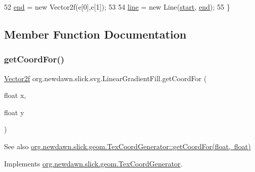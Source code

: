\begin{DoxyCode}
52         \mbox{\hyperlink{classorg_1_1newdawn_1_1slick_1_1svg_1_1_linear_gradient_fill_a708d041bfb9a710bdb328561eacd169e}{end}} = \textcolor{keyword}{new} Vector2f(e[0],e[1]);
53         
54         \mbox{\hyperlink{classorg_1_1newdawn_1_1slick_1_1svg_1_1_linear_gradient_fill_a3c9d1489a824879ba1e0b3a95a08dbda}{line}} = \textcolor{keyword}{new} Line(\mbox{\hyperlink{classorg_1_1newdawn_1_1slick_1_1svg_1_1_linear_gradient_fill_acd016204314fd234afb74aa32282ac7d}{start}}, \mbox{\hyperlink{classorg_1_1newdawn_1_1slick_1_1svg_1_1_linear_gradient_fill_a708d041bfb9a710bdb328561eacd169e}{end}});
55     \}
\end{DoxyCode}


\subsection{Member Function Documentation}
\mbox{\label{classorg_1_1newdawn_1_1slick_1_1svg_1_1_linear_gradient_fill_a2e7291eea3735f7070d9705dd1f43bb3}} 
\subsubsection{\texorpdfstring{get\+Coord\+For()}{getCoordFor()}}
{\footnotesize\ttfamily \mbox{\hyperlink{classorg_1_1newdawn_1_1slick_1_1geom_1_1_vector2f}{Vector2f}} org.\+newdawn.\+slick.\+svg.\+Linear\+Gradient\+Fill.\+get\+Coord\+For (\begin{DoxyParamCaption}\item[{float}]{x,  }\item[{float}]{y }\end{DoxyParamCaption})\hspace{0.3cm}{\ttfamily [inline]}}

\begin{DoxySeeAlso}{See also}
\mbox{\hyperlink{interfaceorg_1_1newdawn_1_1slick_1_1geom_1_1_tex_coord_generator_a2a67773df4f90a0bcb3f65d5499919d7}{org.\+newdawn.\+slick.\+geom.\+Tex\+Coord\+Generator\+::get\+Coord\+For(float, float)}} 
\end{DoxySeeAlso}


Implements \mbox{\hyperlink{interfaceorg_1_1newdawn_1_1slick_1_1geom_1_1_tex_coord_generator_a2a67773df4f90a0bcb3f65d5499919d7}{org.\+newdawn.\+slick.\+geom.\+Tex\+Coord\+Generator}}.


